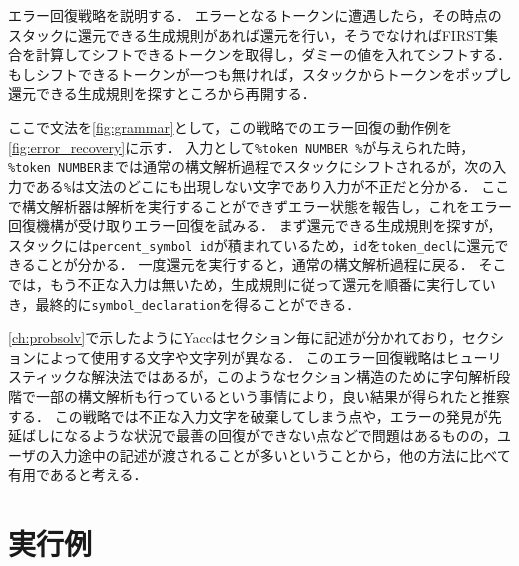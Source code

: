\documentclass[fontsize=9bp,twocolumn,column_gap=2.36zw,a4paper,report]{jlreq}
\begin{document}
\begin{figure}[h]
\end{figure}

エラー回復戦略を説明する．
エラーとなるトークンに遭遇したら，その時点のスタックに還元できる生成規則があれば還元を行い，そうでなければFIRST集合を計算してシフトできるトークンを取得し，ダミーの値を入れてシフトする．
もしシフトできるトークンが一つも無ければ，スタックからトークンをポップし還元できる生成規則を探すところから再開する．\par
ここで文法を\ref{fig:grammar}として，この戦略でのエラー回復の動作例を\ref{fig:error_recovery}に示す．
入力として\texttt{\%token NUMBER \%}が与えられた時，\texttt{\%token NUMBER}までは通常の構文解析過程でスタックにシフトされるが，次の入力である\texttt{\%}は文法のどこにも出現しない文字であり入力が不正だと分かる．
ここで構文解析器は解析を実行することができずエラー状態を報告し，これをエラー回復機構が受け取りエラー回復を試みる．
まず還元できる生成規則を探すが，スタックには\texttt{percent\_symbol id}が積まれているため，\texttt{id}を\texttt{token\_decl}に還元できることが分かる．
一度還元を実行すると，通常の構文解析過程に戻る．
そこでは，もう不正な入力は無いため，生成規則に従って還元を順番に実行していき，最終的に\texttt{symbol\_declaration}を得ることができる．

\begin{figure}[h]
\end{figure}


\begin{figure}[h]
\end{figure}

\ref{ch:probsolv}で示したようにYaccはセクション毎に記述が分かれており，セクションによって使用する文字や文字列が異なる．
このエラー回復戦略はヒューリスティックな解決法ではあるが，このようなセクション構造のために字句解析段階で一部の構文解析も行っているという事情により，良い結果が得られたと推察する．
この戦略では不正な入力文字を破棄してしまう点や，エラーの発見が先延ばしになるような状況で最善の回復ができない点などで問題はあるものの，ユーザの入力途中の記述が渡されることが多いということから，他の方法に比べて有用であると考える．

\chapter{実行例}
\end{document}
